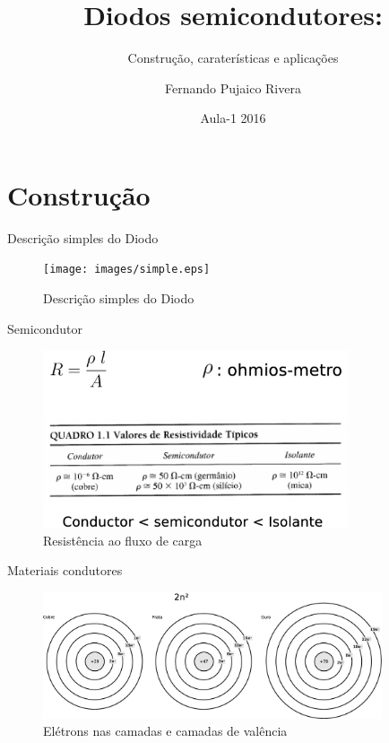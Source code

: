 \documentclass[envcountsect,dvips]{beamer}
\begin{document}
\title[Diodos semicondutores:  ] %
{Diodos semicondutores:}
\subtitle{Construção, caraterísticas e aplicações}
\author[Fernando] %
{Fernando Pujaico Rivera}
\date[2016] %
{Aula-1 2016}
\subject{Computer Science}
\frame{\titlepage}

\section{Construção }

\begin{frame}{Descrição simples do Diodo \cite{boylestaddispositivos} }
\begin{figure}
\centering
\texttt{[image: images/simple.eps]}
\caption{Descrição simples do Diodo}
\label{fig:simples}
\end{figure}
\end{frame}


\begin{frame}{Semicondutor  }
\begin{figure}
\centering
\includegraphics[width=9cm]{images/conductor.eps}
\caption{Resistência ao fluxo de carga}
\label{fig:conductor}
\end{figure}
\end{frame}

\begin{frame}{Materiais condutores   }
\begin{figure}
\centering
\includegraphics[width=10cm]{images/cobre.eps}
\caption{Elétrons nas camadas e camadas de valência}
\label{fig:dopagem}
\end{figure}
\end{frame}
\end{document}
